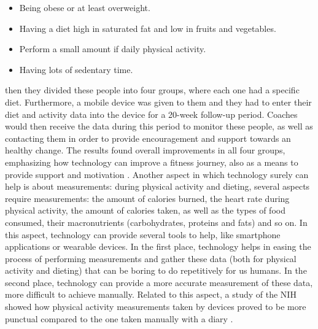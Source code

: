 \begin{itemize}[nosep] %
    \item Being obese or at least overweight.
    \item Having a diet high in saturated fat and low in fruits and vegetables.
    \item Perform a small amount if daily physical activity.
    \item Having lots of sedentary time.
\end{itemize}
then they divided these people into four groups, where each one had a specific diet. Furthermore, a mobile device was given to them and they had to enter their diet and activity data into the device for a 20-week follow-up period. Coaches would then receive the data during this period to monitor these people, as well as contacting them in order to provide encouragement and support towards an healthy change. The results found overall improvements in all four groups, emphasizing how technology can improve a fitness journey, also as a means to provide support and motivation \cite{NihMobileStudies}. \newline Another aspect in which technology surely can help is about measurements: during physical activity and dieting, several aspects require measurements: the amount of calories burned, the heart rate during physical activity, the amount of calories taken, as well as the types of food consumed, their macronutrients (carbohydrates, proteins and fats) and so on. In this aspect, technology can provide several tools to help, like smartphone applications or wearable devices. \newline In the first place, technology helps in easing the process of performing measurements and gather these data (both for physical activity and dieting) that can be boring to do repetitively for us humans. In the second place, technology can provide a more accurate measurement of these data, more difficult to achieve manually. Related to this aspect, a study of the NIH showed how physical activity measurements taken by devices proved to be more punctual compared to the one taken manually with a diary \cite{NihDeviceMeasurements}.%
